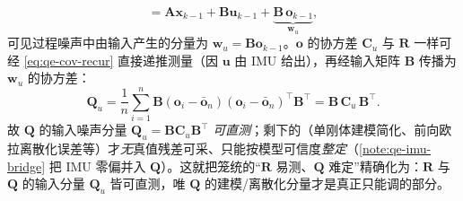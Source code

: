 \begin{derivation}
\begin{equation}
  =\mathbf{A}\boldsymbol x_{k-1}+\mathbf{B}\boldsymbol u_{k-1}+\underbrace{\mathbf{B}\,\boldsymbol o_{k-1}}_{\boldsymbol w_u},
  \label{eq:qe-Qu-input}
\end{equation}
可见过程噪声中由输入产生的分量为 $\boldsymbol w_u=\mathbf{B}\boldsymbol o_{k-1}$。$\boldsymbol o$ 的协方差 $\mathbf{C}_u$ 与 $\mathbf{R}$ 一样可经 \cref{eq:qe-cov-recur} 直接递推测量（因 $\boldsymbol u$ 由 IMU 给出），再经输入矩阵 $\mathbf{B}$ 传播为 $\boldsymbol w_u$ 的协方差：
\begin{equation}
  \boxed{\;\mathbf{Q}_u=\frac1n\sum_{i=1}^{n}\mathbf{B}(\boldsymbol o_i-\bar{\boldsymbol o}_n)(\boldsymbol o_i-\bar{\boldsymbol o}_n)^\top\mathbf{B}^\top=\mathbf{B}\,\mathbf{C}_u\,\mathbf{B}^\top.\;}
  \label{eq:qe-Qu}
\end{equation}
故 $\mathbf{Q}$ 的输入噪声分量 $\mathbf{Q}_u=\mathbf{B}\mathbf{C}_u\mathbf{B}^\top$ \emph{可直测}；剩下的（单刚体建模简化、前向欧拉离散化误差等）才\emph{无}真值残差可采、只能按模型可信度\emph{整定}（\cref{note:qe-imu-bridge} 把 IMU 零偏并入 $\mathbf{Q}$）。这就把笼统的“$\mathbf{R}$ 易测、$\mathbf{Q}$ 难定”精确化为：$\mathbf{R}$ 与 $\mathbf{Q}$ 的输入分量 $\mathbf{Q}_u$ 皆可直测，唯 $\mathbf{Q}$ 的建模/离散化分量才是真正只能调的部分。
\end{derivation}

